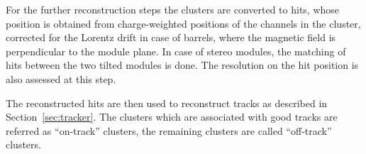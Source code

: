For the further reconstruction steps the clusters are converted to hits, whose position is obtained from charge-weighted positions of the channels in the cluster, corrected for the Lorentz drift in case of barrels, where the magnetic field is perpendicular to the module plane. In case of stereo modules, the matching of hits between the two tilted modules is done. The resolution on the hit position is also assessed at this step.




The reconstructed hits are then used to reconstruct tracks as described in Section~\ref{sec:tracker}. The clusters which are associated with good tracks are referred as ``on-track'' clusters, the remaining clusters are called ``off-track'' clusters.

